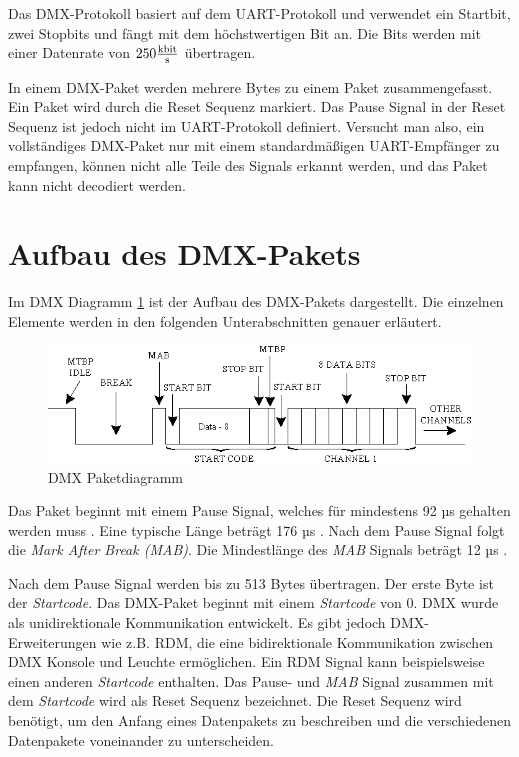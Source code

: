 Das DMX-Protokoll basiert auf dem UART-Protokoll und verwendet ein Startbit, zwei Stopbits und fängt mit dem höchstwertigen Bit an. Die Bits werden mit einer Datenrate von $250 \frac{\SI{}{\kilo\bit}}{\SI{}{\s}}$ übertragen.

In einem DMX-Paket werden mehrere Bytes zu einem Paket zusammengefasst. Ein Paket wird durch die Reset Sequenz markiert. Das Pause Signal in der Reset Sequenz ist jedoch nicht im UART-Protokoll definiert. Versucht man also, ein vollständiges DMX-Paket nur mit einem standardmäßigen UART-Empfänger zu empfangen, können nicht alle Teile des Signals erkannt werden, und das Paket kann nicht decodiert werden\cite[S.29]{RaspberryPiDmxInterface}.

\section{Aufbau des DMX-Pakets}

Im DMX Diagramm \ref{fig:DmxPacketDiagram} ist der Aufbau des DMX-Pakets dargestellt. Die einzelnen Elemente werden in den folgenden Unterabschnitten genauer erläutert.

\begin{figure}[H]
	\centering
	\includegraphics[width=0.8\linewidth]{Pictures/DmxTiming}
	\caption{DMX Paketdiagramm \cite[S.107]{DmxBiDerectionRdmDMX}}
	\label{fig:DmxPacketDiagram}
\end{figure}

Das Paket beginnt mit einem Pause Signal, welches für mindestens 92 µs gehalten werden muss \cite[S.18]{DMX512-Protocol-Standard}. Eine typische Länge beträgt 176 µs \cite[S.18]{DMX512-Protocol-Standard}. Nach dem Pause Signal folgt die \emph{Mark After Break (MAB)}. Die Mindestlänge des \emph{MAB} Signals beträgt 12 µs \cite[p.18]{DMX512-Protocol-Standard}.

Nach dem Pause Signal werden bis zu 513 Bytes übertragen. Der erste Byte ist der \emph{Startcode}. Das DMX-Paket beginnt mit einem \emph{Startcode} von 0. DMX wurde als unidirektionale Kommunikation entwickelt. Es gibt jedoch DMX-Erweiterungen wie z.B. RDM, die eine bidirektionale Kommunikation zwischen DMX Konsole und Leuchte ermöglichen. Ein RDM Signal kann beispielsweise einen anderen \emph{Startcode} enthalten. Das Pause- und \emph{MAB} Signal zusammen mit dem \emph{Startcode} wird als Reset Sequenz bezeichnet. Die  Reset Sequenz wird benötigt, um den Anfang eines Datenpakets zu beschreiben und die verschiedenen Datenpakete voneinander zu unterscheiden.

